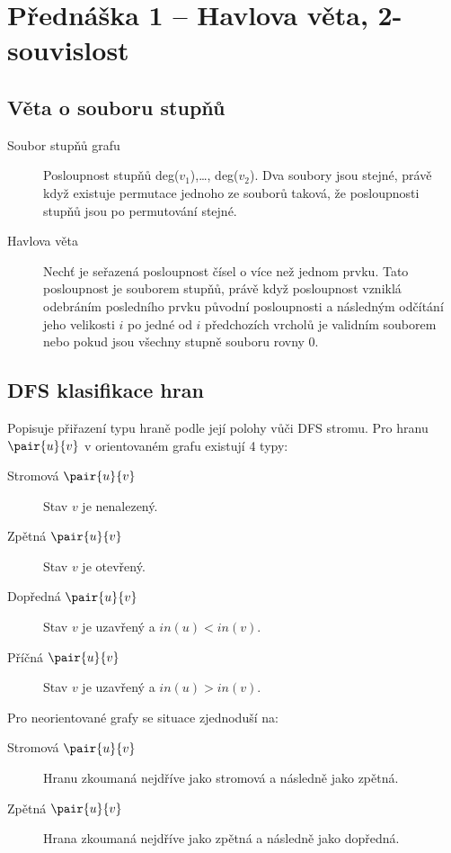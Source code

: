 \section{Přednáška 1 -- Havlova věta, 2-souvislost}

\subsection{Věta o souboru stupňů}\label{alg:havlova-veta}

\begin{description}
    \item[Soubor stupňů grafu] Posloupnost stupňů deg($v_1$),\ldots, deg($v_2$).
    Dva soubory jsou stejné, právě když existuje permutace jednoho ze souborů taková, že posloupnosti stupňů jsou po permutování stejné.
    \item[Havlova věta] Nechť  je seřazená posloupnost čísel o více než jednom prvku.
    Tato posloupnost je souborem stupňů, právě když posloupnost vzniklá odebráním posledního prvku původní posloupnosti a následným odčítání jeho velikosti $i$ po jedné od $i$ předchozích vrcholů je validním souborem nebo pokud jsou všechny stupně souboru rovny $0$.

\end{description}

\subsection{DFS klasifikace hran}
 
 Popisuje přiřazení typu hraně podle její polohy vůči DFS stromu. Pro hranu $\pair{u}{v}$ v orientovaném grafu existují 4 typy:

 \begin{description}
     \item[Stromová $\pair{u}{v}$] Stav $v$ je nenalezený.
     \item[Zpětná $\pair{u}{v}$] Stav $v$ je otevřený.
     \item[Dopředná $\pair{u}{v}$] Stav $v$ je uzavřený a $in(u) < in(v)$.
     \item[Příčná $\pair{u}{v}$] Stav $v$ je uzavřený a $in(u) > in(v)$.
 \end{description}

 Pro neorientované grafy se situace zjednoduší na:

  \begin{description}
     \item[Stromová $\pair{u}{v}$] Hranu zkoumaná nejdříve jako stromová a následně jako zpětná.
     \item[Zpětná $\pair{u}{v}$] Hrana zkoumaná nejdříve jako zpětná a následně jako dopředná.
 \end{description}

